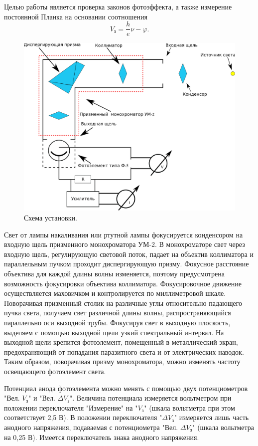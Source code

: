 \documentclass[12pt]{article}
\begin{document}
	Целью работы является проверка законов фотоэффекта, а также измерение постоянной Планка на основании соотношения 
	\begin{equation}
		V_{\text{з}} = \dfrac{h}{e}\nu - \varphi.
	\end{equation}

	\begin{figure}[htbp]
		\centering
		\includegraphics[width=1\linewidth]{../drawings/fig1.png}
		\caption{Схема установки.}
		\label{fig:1}
	\end{figure}
	Свет от лампы накаливания или ртутной лампы фокусируется конденсором на входную щель призменного монохроматора УМ-2. В монохроматоре свет через входную щель, регулирующую световой поток, падает на объектив коллиматора и параллельным пучком проходит диспергирующую призму. Фокусное расстояние объектива для каждой длины волны изменяется, поэтому предусмотрена возможность фокусировки объектива коллиматора. Фокусировочное движение осуществляется маховичком и контролируется по миллиметровой шкале. Поворачивая призменный столик на различные углы относительно падающего пучка света, получаем свет различной длины волны, распространяющийся параллельно оси выходной трубы. Фокусируя свет в выходную плоскость, выделяем с помощью выходной щели узкий спектральный интервал. На выходной щели крепится фотоэлемент, помещенный в металлический экран, предохраняющий от попадания паразитного света и от электрических наводок. Таким образом, поворачивая призму монохроматора, можно изменять частоту освещающего фотоэлемент света.

	\par Потенциал анода фотоэлемента можно менять с помощью двух потенциометров "{}Вел. $V_\text{з}$"{} и "{}Вел. $\Delta V_\text{з}$"{}. Величина потенциала измеряется вольтметром при положении переключателя "{}Измерение"{} на "{}$V_\text{з}$"{} (шкала вольтметра при этом соответствует 2,5 В). В положении переключателя "{}$\Delta V_\text{з}$"{} измеряется лишь часть анодного напряжения, подаваемая с потенциометра "{}Вел. $\Delta V_\text{з}$"{} (шкала вольтметра на 0,25 В). Имеется переключатель знака анодного напряжения.
\end{document}

